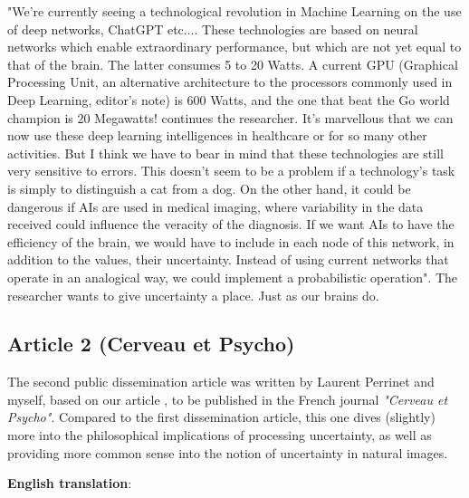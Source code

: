 "We're currently seeing a technological revolution in Machine Learning on the use of deep networks, ChatGPT etc.... These technologies are based on neural networks which enable extraordinary performance, but which are not yet equal to that of the brain. The latter consumes 5 to 20 Watts. A current GPU (Graphical Processing Unit, an alternative architecture to the processors commonly used in Deep Learning, editor's note) is 600 Watts, and the one that beat the Go world champion is 20 Megawatts! continues the researcher. It's marvellous that we can now use these deep learning intelligences in healthcare or for so many other activities. But I think we have to bear in mind that these technologies are still very sensitive to errors. This doesn't seem to be a problem if a technology's task is simply to distinguish a cat from a dog. On the other hand, it could be dangerous if AIs are used in medical imaging, where variability in the data received could influence the veracity of the diagnosis. If we want AIs to have the efficiency of the brain, we would have to include in each node of this network, in addition to the values, their uncertainty. Instead of using current networks that operate in an analogical way, we could implement a probabilistic operation". The researcher wants to give uncertainty a place. Just as our brains do.



\clearpage



\subsection{Article 2 (Cerveau et Psycho)}
The second public dissemination article was written by Laurent Perrinet and myself, based on our article , to be published in the French journal \textit{"Cerveau et Psycho"}. Compared to the first dissemination article, this one dives (slightly) more into the philosophical implications of processing uncertainty, as well as providing more common sense into the notion of uncertainty in natural images.

\clearpage
\textbf{English translation}:

